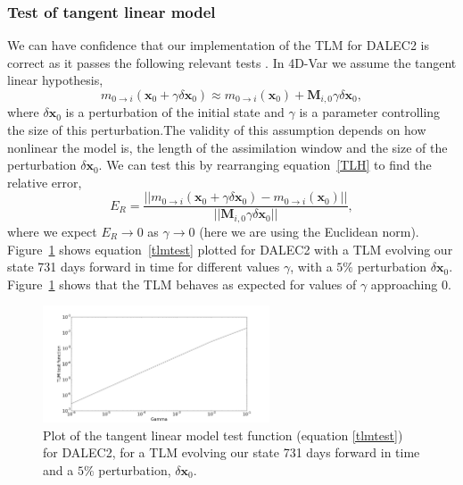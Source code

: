 \documentclass[11pt]{article}
\begin{document}
\subsubsection{Test of tangent linear model} \label{sec:testtlm}

We can have confidence that our implementation of the TLM for DALEC2 is correct as it passes the following relevant tests \citep{Li1994}. In 4D-Var we assume the tangent linear hypothesis,
\begin{equation}
m_{0\rightarrow i}(\mathbf{x}_0+\gamma \delta\mathbf{x}_0) \approx m_{0 \rightarrow i}(\mathbf{x}_0) + \mathbf{M}_{i,0}\gamma \delta\mathbf{x}_0, \label{TLH}
\end{equation}
where $\delta\mathbf{x}_0$ is a perturbation of the initial state and $\gamma$ is a parameter controlling the size of this perturbation.The validity of this assumption depends on how nonlinear the model is, the length of the assimilation window and the size of the perturbation $\delta\mathbf{x}_0$. We can test this by rearranging equation~\ref{TLH} to find the relative error,
\begin{equation}
E_R=\frac{||m_{0\rightarrow i}(\mathbf{x}_0+\gamma \delta\mathbf{x}_0) - m_{0 \rightarrow i}(\mathbf{x}_0)||}{||\mathbf{M}_{i,0}\gamma\delta\mathbf{x}_0||}, \label{tlmtest}
\end{equation}
where we expect $E_R \rightarrow 0$ as $\gamma \rightarrow 0$ (here we are using the Euclidean norm). Figure~\ref{fig:tlm} shows equation~\ref{tlmtest} plotted for DALEC2 with a TLM evolving our state 731 days forward in time for different values $\gamma$, with a $5\%$ perturbation $\delta\mathbf{x}_0$. Figure~\ref{fig:tlm} shows that the TLM behaves as expected for values of $\gamma$ approaching $0$.


\begin{figure}[ht]
    \centering
    \includegraphics[width=0.6\textwidth]{testtlmer.png}
    \caption{Plot of the tangent linear model test function (equation \ref{tlmtest}) for DALEC2, for a TLM evolving our state 731 days forward in time and a $5\%$ perturbation, $\delta \textbf{x}_0$.}
    \label{fig:tlm}
\end{figure}
\end{document}
